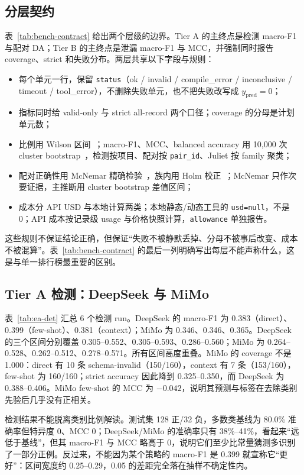 \documentclass[conference]{IEEEtran}
\begin{document}
\subsection{分层契约}
表~\ref{tab:bench-contract} 给出两个层级的边界。Tier A 的主终点是检测 macro-F1 与配对 DA；Tier B 的主终点是泄漏 macro-F1 与 MCC，并强制同时报告 coverage、strict 和失败分布。两层共享以下字段与规则：
\begin{itemize}
    \item 每个单元一行，保留 \texttt{status}（ok / invalid / compile\_error / inconclusive / timeout / tool\_error），不删除失败单元，也不把失败改写成 $y_{\mathrm{pred}}=0$；
    \item 指标同时给 valid-only 与 strict all-record 两个口径；coverage 的分母是计划单元数；
    \item 比例用 Wilson 区间~\cite{wilson1927}；macro-F1、MCC、balanced accuracy 用 10{,}000 次 cluster bootstrap~\cite{efron1979}，检测按项目、配对按 \texttt{pair\_id}、Juliet 按 family 聚类；
    \item 配对正确性用 McNemar 精确检验~\cite{mcnemar1947}，族内用 Holm 校正~\cite{holm1979}；McNemar 只作次要证据，主推断用 cluster bootstrap 差值区间；
    \item 成本分 API USD 与本地计算两类；本地静态/动态工具的 \texttt{usd=null}，不是 0；API 成本按记录级 usage 与价格快照计算，\texttt{allowance} 单独报告。
\end{itemize}
这些规则不保证结论正确，但保证“失败不被静默丢掉、分母不被事后改变、成本不被混算”。表~\ref{tab:bench-contract} 的最后一列明确写出每层不能声称什么，这是与单一排行榜最重要的区别。



\subsection{Tier A 检测：DeepSeek 与 MiMo}
表~\ref{tab:ea-det} 汇总 6 个检测 run。DeepSeek 的 macro-F1 为 0.383（direct）、0.399（few-shot）、0.381（context）；MiMo 为 0.346、0.346、0.365。DeepSeek 的三个区间分别覆盖 0.305--0.552、0.305--0.593、0.286--0.560；MiMo 为 0.264--0.528、0.262--0.512、0.278--0.571。所有区间高度重叠。MiMo 的 coverage 不是 1.000：direct 有 10 条 schema-invalid（150/160），context 有 7 条（153/160），few-shot 为 160/160；strict accuracy 因此降到 0.325--0.350，而 DeepSeek 为 0.388--0.406。MiMo few-shot 的 MCC 为 $-0.042$，说明其预测与标签在去除类别先验后几乎没有正相关。

检测结果不能脱离类别比例解读。测试集 128 正/32 负，多数类基线为 80.0\% 准确率但特异度 0、MCC 0；DeepSeek/MiMo 的准确率只有 38\%--41\%，看起来“远低于基线”，但其 macro-F1 与 MCC 略高于 0，说明它们至少比常量猜测多识别了一部分正例。反过来，不能因为某个策略的 macro-F1 是 0.399 就宣称它“更好”：区间宽度约 0.25--0.29，0.05 的差距完全落在抽样不确定性内。
\end{document}
